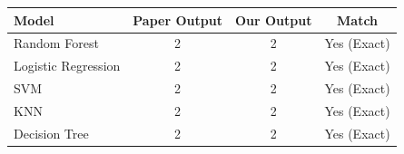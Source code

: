 \begin{tabular}{lccc}
\toprule
Model & Paper Output & Our Output & Match \\ \midrule
Random Forest & 2 & 2 & Yes (Exact) \\
Logistic Regression & 2 & 2 & Yes (Exact) \\
SVM & 2 & 2 & Yes (Exact) \\
KNN & 2 & 2 & Yes (Exact) \\
Decision Tree & 2 & 2 & Yes (Exact) \\
\bottomrule
\end{tabular}
